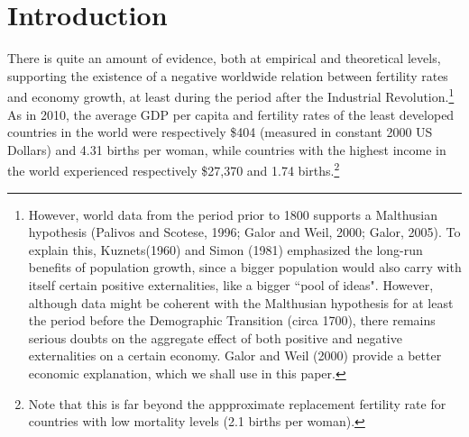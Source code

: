 \documentclass[12pt]{article}%
\begin{document}
\section{Introduction}
There is quite an amount of evidence, both at empirical and theoretical levels, supporting the existence of a negative worldwide relation between fertility rates and economy growth, at least during the period after the Industrial Revolution.\footnote{However, world data from the period prior to 1800 supports a Malthusian hypothesis (Palivos and Scotese, 1996; Galor and Weil, 2000; Galor, 2005). To explain this, Kuznets(1960) and Simon (1981) emphasized the long-run benefits of population growth, since a bigger population would also carry with itself certain positive externalities, like a bigger ``pool of ideas". However, although data might be coherent with the Malthusian hypothesis for at least the period before the Demographic Transition (circa 1700), there remains serious doubts on the aggregate effect of both positive and negative externalities on a certain economy. Galor and Weil (2000) provide a better economic explanation, which we shall use in this paper.} As in 2010, the average GDP per capita and fertility rates of the least developed countries in the world were respectively \$404 (measured in constant 2000 US Dollars) and 4.31 births per woman, while countries with the highest income in the world experienced respectively \$27,370 and 1.74 births\cite{WorldBank1}.\footnote{Note that this is far beyond the appproximate replacement fertility rate for countries with low mortality levels (2.1 births per woman).}
\end{document}
